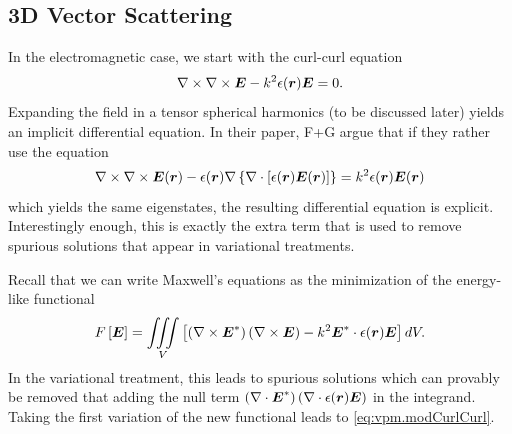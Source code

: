 \subsection{3D Vector Scattering}
In the electromagnetic case, we start with the curl-curl equation
  \begin{equation}
    \nabla\times\nabla\times\boldsymbol{E}-k^2\epsilon(\boldsymbol{r})\boldsymbol{E}=0.
  \end{equation}
Expanding the field in a tensor spherical harmonics (to be discussed later) yields
an implicit differential equation. In their paper, F+G argue that if they rather
use the equation
  \begin{equation}
   \label{eq:vpm.modCurlCurl}
   \nabla\times\nabla\times\boldsymbol{E}(\boldsymbol{r})-\epsilon(\boldsymbol{r})\nabla\left\{\nabla\cdot\left[\epsilon(\boldsymbol{r})\boldsymbol{E}(\boldsymbol{r})\right]\right\}
      =k^2\epsilon(\boldsymbol{r})\boldsymbol{E}(\boldsymbol{r})
  \end{equation}
which yields the same eigenstates, the resulting differential equation is explicit. 
Interestingly enough, this is exactly the extra term that is used to remove
spurious solutions that appear in variational treatments. 

Recall that we can write Maxwell's equations as the minimization of the energy-like functional
  \begin{equation}
   F\left[\boldsymbol{E}\right]=\mathop{\iiint}_V\left[\left(\nabla\times\boldsymbol{E}^*\right)\left(\nabla\times\boldsymbol{E}\right)-k^2\boldsymbol{E}^*\cdot\epsilon(\boldsymbol{r})\boldsymbol{E}\right]dV.
  \end{equation}
In the variational treatment, this leads to spurious solutions which can provably be removed \cite{KON1976,KOS1984,KOS1985} that adding the null term
$\left(\nabla\cdot\boldsymbol{E}^*\right)\left(\nabla\cdot\epsilon(\boldsymbol{r})\boldsymbol{E}\right)$ in the integrand. 
Taking the first variation of the new functional leads to \eqref{eq:vpm.modCurlCurl}.
  
